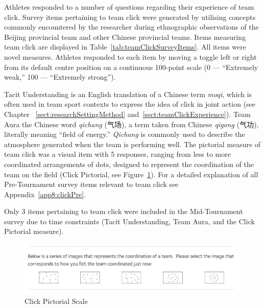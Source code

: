 \begin{CJK}{UTF8}{gbsn}

Athletes responded to a number of questions regarding their experience of team click. Survey items pertaining to team click were generated by utilising concepts commonly encountered by the researcher during ethnographic observations of the Beijing provincial team and other Chinese provincial teams. Items measuring team click are displayed in Table~\ref{tab:teamClickSurveyItems}.  All items were novel measures. Athletes responded to each item by moving a toggle left or right from its default centre position on a continuous 100-point scale (0 --- ``Extremely weak,'' 100 --- ``Extremely strong'').

Tacit Understanding is an English translation of a Chinese term \textit{moqi}, which is often used in team sport contexts to express the idea of click in joint action (see Chapter ~\ref{sect:researchSettingMethod} and~\ref{sect:teamClickExperience}).  Team Aura the Chinese word \textit{qichang} (气场), a term taken from Chinese \textit{qigong} (气功), literally meaning ``field of energy.'' \textit{Qichang} is commonly used to describe the atmosphere generated when the team is performing well.  The pictorial measure of team click was a visual item with 5 responses, ranging from less to more coordinated arrangements of dots, designed to represent the coordination of the team on the field (Click Pictorial, see Figure~\ref{fig:clickPictorial}).
For a detailed explanation of all Pre-Tournament survey items relevant to team click see Appendix~\ref{app8:clickPre}.

Only 3 items pertaining to team click were included in the Mid-Tournament survey due to time constraints (Tacit Understanding, Team Aura, and the Click Pictorial measure).




  \begin{figure}[htbp]
    \includegraphics[width = \linewidth]{images/teamClickPictorial.png}
    \caption{Click Pictorial Scale}
    \label{fig:clickPictorial}
  \end{figure}



\end{CJK}
